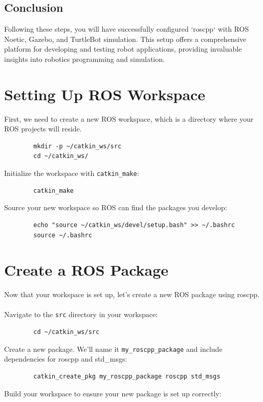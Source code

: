 \documentclass[12pt,a4paper]{article}
\begin{document}
	\subsection{Conclusion}
	Following these steps, you will have successfully configured `roscpp` with ROS Noetic, Gazebo, and TurtleBot simulation. This setup offers a comprehensive platform for developing and testing robot applications, providing invaluable insights into robotics programming and simulation.
	
	\section{Setting Up ROS Workspace}
	First, we need to create a new ROS workspace, which is a directory where your ROS projects will reside.
	
	\begin{verbatim}
		mkdir -p ~/catkin_ws/src
		cd ~/catkin_ws/
	\end{verbatim}
	Initialize the workspace with \texttt{catkin\_make}:
	
	\begin{verbatim}
		catkin_make
	\end{verbatim}
	Source your new workspace so ROS can find the packages you develop:
	
	\begin{verbatim}
		echo "source ~/catkin_ws/devel/setup.bash" >> ~/.bashrc
		source ~/.bashrc
	\end{verbatim}
	
	\section{Create a ROS Package}
	Now that your workspace is set up, let's create a new ROS package using roscpp.
	\\\\
	\noindent Navigate to the \texttt{src} directory in your workspace:
	
	\begin{verbatim}
		cd ~/catkin_ws/src
	\end{verbatim}
	Create a new package. We'll name it \texttt{my\_roscpp\_package} and include dependencies for roscpp and std\_msgs:
	
	\begin{verbatim}
		catkin_create_pkg my_roscpp_package roscpp std_msgs
	\end{verbatim}
	Build your workspace to ensure your new package is set up correctly:
	
\end{document}
